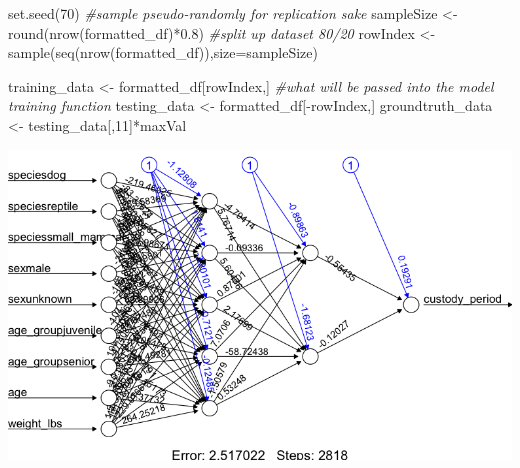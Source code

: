 \documentclass[
]{article}
\newenvironment{Shaded}{\begin{snugshade}}{\end{snugshade}}
\newcommand{\AttributeTok}[1]{\textcolor[rgb]{0.77,0.63,0.00}{#1}}
\newcommand{\CommentTok}[1]{\textcolor[rgb]{0.56,0.35,0.01}{\textit{#1}}}
\newcommand{\DecValTok}[1]{\textcolor[rgb]{0.00,0.00,0.81}{#1}}
\newcommand{\FloatTok}[1]{\textcolor[rgb]{0.00,0.00,0.81}{#1}}
\newcommand{\FunctionTok}[1]{\textcolor[rgb]{0.00,0.00,0.00}{#1}}
\newcommand{\NormalTok}[1]{#1}
\newcommand{\OtherTok}[1]{\textcolor[rgb]{0.56,0.35,0.01}{#1}}
\newcommand{\SpecialCharTok}[1]{\textcolor[rgb]{0.00,0.00,0.00}{#1}}
\begin{document}
\begin{Shaded}
\begin{Highlighting}[]
\FunctionTok{set.seed}\NormalTok{(}\DecValTok{70}\NormalTok{) }\CommentTok{\#sample pseudo{-}randomly for replication sake}
\NormalTok{sampleSize }\OtherTok{\textless{}{-}} \FunctionTok{round}\NormalTok{(}\FunctionTok{nrow}\NormalTok{(formatted\_df)}\SpecialCharTok{*}\FloatTok{0.8}\NormalTok{) }\CommentTok{\#split up dataset 80/20}
\NormalTok{rowIndex }\OtherTok{\textless{}{-}} \FunctionTok{sample}\NormalTok{(}\FunctionTok{seq}\NormalTok{(}\FunctionTok{nrow}\NormalTok{(formatted\_df)),}\AttributeTok{size=}\NormalTok{sampleSize)}

\NormalTok{training\_data }\OtherTok{\textless{}{-}}\NormalTok{ formatted\_df[rowIndex,] }\CommentTok{\#what will be passed into the model training function}
\NormalTok{testing\_data }\OtherTok{\textless{}{-}}\NormalTok{  formatted\_df[}\SpecialCharTok{{-}}\NormalTok{rowIndex,]}
\NormalTok{groundtruth\_data }\OtherTok{\textless{}{-}}\NormalTok{ testing\_data[,}\DecValTok{11}\NormalTok{]}\SpecialCharTok{*}\NormalTok{maxVal}
\end{Highlighting}
\end{Shaded}

\begin{Shaded}
\end{Shaded}

\includegraphics{media/NHSEnet2.png}
\end{document}
